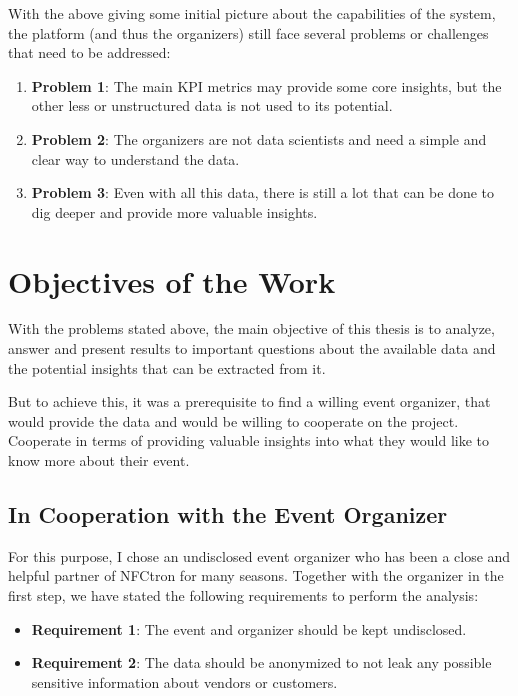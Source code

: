 With the above giving some initial picture about the capabilities of the system, the platform (and thus the organizers) still face several problems or challenges that need to be addressed:
\begin{enumerate}
	\item \textbf{Problem 1}: The main KPI metrics may provide some core insights, but the other less or unstructured data is not used to its potential.
	\item \textbf{Problem 2}: The organizers are not data scientists and need a simple and clear way to understand the data.
	\item \textbf{Problem 3}: Even with all this data, there is still a lot that can be done to dig deeper and provide more valuable insights.
\end{enumerate}

\section*{Objectives of the Work}
\label{sec:introduction-objectives}
With the problems stated above, the main objective of this thesis is to analyze, answer and present results to important questions about the available data and the potential insights that can be extracted from it.

But to achieve this, it was a prerequisite to find a willing event organizer, that would provide the data and would be willing to cooperate on the project.
Cooperate in terms of providing valuable insights into what they would like to know more about their event.

\subsection*{In Cooperation with the Event Organizer}
\label{subsec:introduction-objectives-cooperation}
For this purpose, I chose an undisclosed event organizer who has been a close and helpful partner of NFCtron for many seasons.
Together with the organizer in the first step, we have stated the following requirements to perform the analysis:
\begin{itemize}
	\item \textbf{Requirement 1}: The event and organizer should be kept undisclosed.
	\item \textbf{Requirement 2}: The data should be anonymized to not leak any possible sensitive information about vendors or customers.
\end{itemize}

